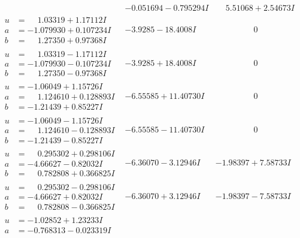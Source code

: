 \documentclass[1p]{elsarticle_modified}
\theoremstyle{definition}
\begin{document}
$$\begin{array}{c|c|c}
 & -0.051694 - 0.795294 I & \phantom{-}5.51068 + 2.54673 I \\ \hline\begin{aligned}
u &= \phantom{-}1.03319 + 1.17112 I \\
a &= -1.079930 + 0.107234 I \\
b &= \phantom{-}1.27350 + 0.97368 I\end{aligned}
 & -3.9285 - 18.4008 I & \phantom{-0.000000 } 0 \\ \hline\begin{aligned}
u &= \phantom{-}1.03319 - 1.17112 I \\
a &= -1.079930 - 0.107234 I \\
b &= \phantom{-}1.27350 - 0.97368 I\end{aligned}
 & -3.9285 + 18.4008 I & \phantom{-0.000000 } 0 \\ \hline\begin{aligned}
u &= -1.06049 + 1.15726 I \\
a &= \phantom{-}1.124610 + 0.128893 I \\
b &= -1.21439 + 0.85227 I\end{aligned}
 & -6.55585 + 11.40730 I & \phantom{-0.000000 } 0 \\ \hline\begin{aligned}
u &= -1.06049 - 1.15726 I \\
a &= \phantom{-}1.124610 - 0.128893 I \\
b &= -1.21439 - 0.85227 I\end{aligned}
 & -6.55585 - 11.40730 I & \phantom{-0.000000 } 0 \\ \hline\begin{aligned}
u &= \phantom{-}0.295302 + 0.298106 I \\
a &= -4.66627 - 0.82032 I \\
b &= \phantom{-}0.782808 + 0.366825 I\end{aligned}
 & -6.36070 - 3.12946 I & -1.98397 + 7.58733 I \\ \hline\begin{aligned}
u &= \phantom{-}0.295302 - 0.298106 I \\
a &= -4.66627 + 0.82032 I \\
b &= \phantom{-}0.782808 - 0.366825 I\end{aligned}
 & -6.36070 + 3.12946 I & -1.98397 - 7.58733 I \\ \hline\begin{aligned}
u &= -1.02852 + 1.23233 I \\
a &= -0.768313 - 0.023319 I \\

\end{aligned}
\end{array}$$
\end{document}
